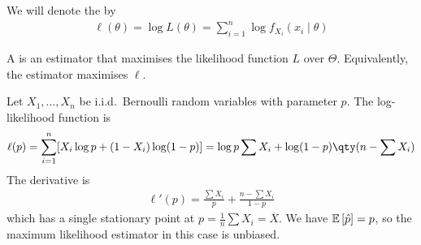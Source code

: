 \begin{definition}
	We will denote the  by
	\begin{align*}
		\ell(\theta) = \log L(\theta) = \sum_{i=1}^n \log f_{X_i} (x_i \mid \theta)
	\end{align*}
\end{definition} 
\begin{definition}
	A  is an estimator that maximises the likelihood function $L$ over $\Theta$.
	Equivalently, the estimator maximises $\ell$.
\end{definition}

\begin{example}
	Let $X_1, \dots, X_n$ be i.i.d.\ Bernoulli random variables with parameter $p$.
	The log-likelihood function is
	\begin{align*}
		\ell(p) = \sum_{i=1}^n [X_i \log p + (1-X_i) \log (1-p)] = \log p \sum X_i + \log(1-p) \qty(n - \sum X_i)
	\end{align*}
	The derivative is
	\begin{align*}
		\ell'(p) = \frac{\sum X_i}{p} + \frac{n - \sum X_i}{1-p}
	\end{align*}
	which has a single stationary point at $p = \frac{1}{n} \sum X_i = \overline X$.
	We have $\mathbb{E}\left[{\hat p}\right] = p$, so the maximum likelihood estimator in this case is unbiased.
\end{example}

